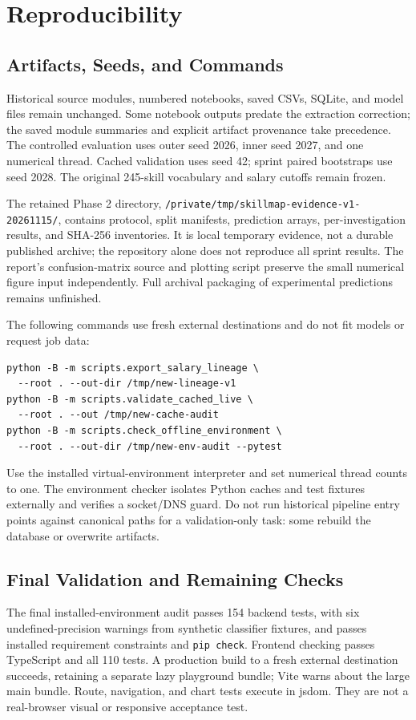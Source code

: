 \documentclass[sigconf,nonacm]{acmart}
\begin{document}
\section{Reproducibility}
\subsection{Artifacts, Seeds, and Commands}
Historical source modules, numbered notebooks, saved CSVs, SQLite, and model files remain unchanged. Some notebook outputs predate the extraction correction; the saved module summaries and explicit artifact provenance take precedence. The controlled evaluation uses outer seed 2026, inner seed 2027, and one numerical thread. Cached validation uses seed 42; sprint paired bootstraps use seed 2028. The original 245-skill vocabulary and salary cutoffs remain frozen.

The retained Phase 2 directory, \texttt{/private/tmp/skillmap-evidence-v1-20261115/}, contains protocol, split manifests, prediction arrays, per-investigation results, and SHA-256 inventories. It is local temporary evidence, not a durable published archive; the repository alone does not reproduce all sprint results. The report's confusion-matrix source and plotting script preserve the small numerical figure input independently. Full archival packaging of experimental predictions remains unfinished.

The following commands use fresh external destinations and do not fit models or request job data:
\begin{verbatim}
python -B -m scripts.export_salary_lineage \
  --root . --out-dir /tmp/new-lineage-v1
python -B -m scripts.validate_cached_live \
  --root . --out /tmp/new-cache-audit
python -B -m scripts.check_offline_environment \
  --root . --out-dir /tmp/new-env-audit --pytest
\end{verbatim}
Use the installed virtual-environment interpreter and set numerical thread counts to one. The environment checker isolates Python caches and test fixtures externally and verifies a socket/DNS guard. Do not run historical pipeline entry points against canonical paths for a validation-only task: some rebuild the database or overwrite artifacts.

\subsection{Final Validation and Remaining Checks}
The final installed-environment audit passes 154 backend tests, with six undefined-precision warnings from synthetic classifier fixtures, and passes installed requirement constraints and \texttt{pip check}. Frontend checking passes TypeScript and all 110 tests. A production build to a fresh external destination succeeds, retaining a separate lazy playground bundle; Vite warns about the large main bundle. Route, navigation, and chart tests execute in jsdom. They are not a real-browser visual or responsive acceptance test.
\end{document}
